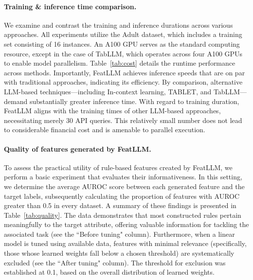 \vspace*{-0.12in}
\paragraph{Training \& inference time comparison.} We examine and contrast the training and inference durations across various approaches. All experiments utilize the Adult dataset, which includes a training set consisting of 16 instances. An A100 GPU serves as the standard computing resource, except in the case of TabLLM, which operates across four A100 GPUs to enable model parallelism. Table~\ref{tab:cost} details the runtime performance across methods. Importantly, \textsf{FeatLLM} achieves inference speeds that are on par with traditional approaches, indicating its efficiency. By comparison, alternative LLM-based techniques—including In-context learning, TABLET, and TabLLM—demand substantially greater inference time. With regard to training duration, \textsf{FeatLLM} aligns with the training times of other LLM-based approaches, necessitating merely 30 API queries. This relatively small number does not lead to considerable financial cost and is amenable to parallel execution. 

\vspace*{-0.12in}
\paragraph{Quality of features generated by \textsf{FeatLLM}.}
To assess the practical utility of rule-based features created by \textsf{FeatLLM}, we perform a basic experiment that evaluates their informativeness. In this setting, we determine the average AUROC score between each generated feature and the target labels, subsequently calculating the proportion of features with AUROC greater than 0.5 in every dataset. 
A summary of these findings is presented in Table~\ref{tab:quality}. The data demonstrates that most constructed rules pertain meaningfully to the target attribute, offering valuable information for tackling the associated task (see the ``Before tuning" column). Furthermore, when a linear model is tuned using available data, features with minimal relevance (specifically, those whose learned weights fall below a chosen threshold) are systematically excluded (see the ``After tuning" column). The threshold for exclusion was established at 0.1, based on the overall distribution of learned weights.

\vspace*{-0.12in}
